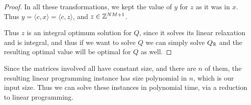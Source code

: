 \begin{proof}
In all these transformations, we kept the value of $y$ for $z$ as it was in $x$. Thus $y = \langle c, x \rangle = \langle c, z \rangle$, and $z \in \mathbb{Z}^{NM+1}$.

Thus $z$ is an integral optimum solution for $Q$, since it solves its linear relaxation and is integral, and thus if we want to solve $Q$ we can simply solve $Q_{\mathbb{R}}$ and the resulting optimal value will be optimal for $Q$ as well.
\end{proof}

Since the matrices involved all have constant size, and there are $n$ of them, the resulting linear programming instance has size polynomial in $n$, which is our input size. Thus we can solve these instances in polynomial time, via a reduction to linear programming.
